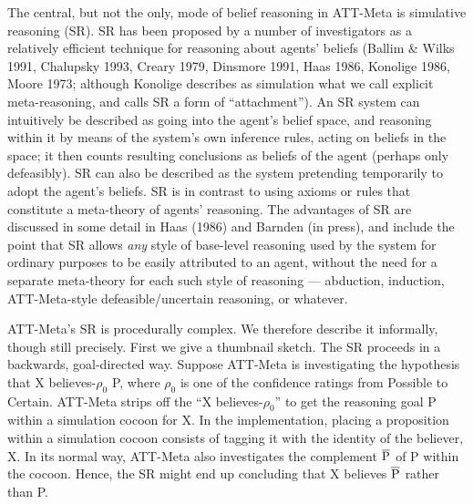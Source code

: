 The central, but not the only, mode of belief reasoning in ATT-Meta is
simulative reasoning (SR). SR has been proposed by a number of investigators as
a relatively efficient technique for reasoning about agents' beliefs (Ballim \&
Wilks 1991, Chalupsky 1993, Creary 1979, Dinsmore 1991, Haas 1986, Konolige
1986, Moore 1973; although Konolige describes as simulation what we call
explicit meta-reasoning, and calls SR a form of ``attachment'').  An SR system
can intuitively be described as going into the agent's belief space, and
reasoning within it by means of the system's own inference rules, acting on
beliefs in the space; it then counts resulting conclusions as beliefs of the
agent (perhaps only defeasibly). SR can also be described as the system
pretending temporarily to adopt the agent's beliefs. SR is in contrast to using
axioms or rules that constitute a meta-theory of agents' reasoning. The
advantages of SR are discussed in some detail in Haas (1986) and Barnden (in
press), and include the point that SR allows {\it any} style of base-level
reasoning used by the system for ordinary purposes to be easily attributed to
an agent, without the need for a separate meta-theory for each such style of
reasoning --- abduction, induction, ATT-Meta-style defeasible/uncertain
reasoning, or whatever.

ATT-Meta's SR is procedurally complex. We therefore describe it informally,
though still precisely. First we give a thumbnail sketch.  The SR proceeds in a
backwards, goal-directed way.  Suppose ATT-Meta is investigating the hypothesis
that X believes-$\rho_0$ P, where $\rho_0$ is one of the confidence ratings
from Possible to Certain.  ATT-Meta strips off the ``X believes-$\rho_0$''
to get the reasoning goal P within a simulation cocoon for X.  In the
implementation, placing a proposition within a simulation cocoon consists of
tagging it with the identity of the believer, X.  In its normal way, ATT-Meta
also investigates the complement $\overline{{\rm P}}$ of P within the cocoon.
Hence, the SR might end up concluding that X believes $\overline{{\rm P}}$
rather than P.

